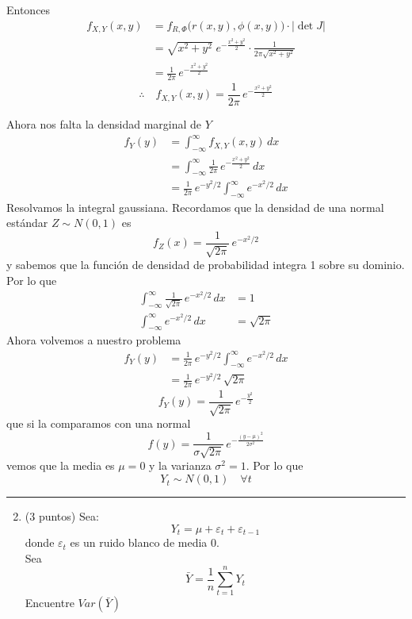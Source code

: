 \documentclass[9pt]{extarticle}
\begin{document}
Entonces
\begin{align*}
f_{X,Y}(x,y) &= f_{R,\Phi}\bigl(r(x,y),\phi(x,y)\bigr)\cdot\lvert\det J\rvert\\
&= \sqrt{x^2+y^2}\;e^{-\frac{x^2+y^2}{2}}\cdot\frac{1}{2\pi\sqrt{x^2+y^2}}\\
&= \frac{1}{2\pi}\,e^{-\frac{x^2+y^2}{2}}
\end{align*}
\[
\therefore\quad \boxed{f_{X,Y}(x,y) = \frac{1}{2\pi}\,e^{-\frac{x^2+y^2}{2}}}
\]

Ahora nos falta la densidad marginal de $Y$
\begin{align*}
f_Y(y) &= \int_{-\infty}^{\infty} f_{X,Y}(x,y)\,dx\\
&= \int_{-\infty}^{\infty} \frac{1}{2\pi}\,e^{-\frac{x^2+y^2}{2}}\,dx\\
&= \frac{1}{2\pi}\,e^{-y^2/2}\int_{-\infty}^{\infty} e^{-x^2/2}\,dx
\end{align*}
Resolvamos la integral gaussiana. Recordamos que la densidad de una normal estándar $Z \sim N(0,1)$ es
\[
f_Z(x) = \frac{1}{\sqrt{2\pi}}\,e^{-x^2/2}
\]
y sabemos que la función de densidad de probabilidad integra 1 sobre su dominio. Por lo que
\begin{align*}
\int_{-\infty}^{\infty}\frac{1}{\sqrt{2\pi}}\,e^{-x^2/2}\,dx &= 1\\
\int_{-\infty}^{\infty} e^{-x^2/2}\,dx &= \sqrt{2\pi}
\end{align*}
Ahora volvemos a nuestro problema
\begin{align*}
f_Y(y) &= \frac{1}{2\pi}\,e^{-y^2/2}\int_{-\infty}^{\infty} e^{-x^2/2}\,dx\\
&= \frac{1}{2\pi}\,e^{-y^2/2}\,\sqrt{2\pi}
\end{align*}
\[
\boxed{f_Y(y) = \frac{1}{\sqrt{2\pi}}\,e^{-\frac{y^2}{2}}}
\]
que si la comparamos con una normal
\[
f(y) = \frac{1}{\sigma\sqrt{2\pi}}\,e^{-\frac{(y-\mu)^2}{2\sigma^2}}
\]
vemos que la media es $\mu=0$ y la varianza $\sigma^2=1$. Por lo que
\[
\boxed{Y_t \sim N(0,1)\quad \forall t}
\]

\bigskip
\hrule
\bigskip
\begin{enumerate}\setcounter{enumi}{1}
\item (3 puntos) Sea:
\[ Y_t = \mu + \varepsilon_t + \varepsilon_{t-1} \]
donde $\varepsilon_t$ es un ruido blanco de media 0.\\
Sea
\[ \bar{Y} = \frac{1}{n}\sum_{t=1}^{n} Y_t \]
Encuentre $Var(\bar{Y})$
\end{enumerate}
\end{document}
